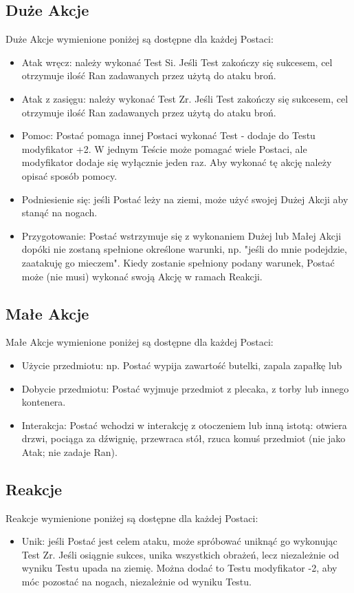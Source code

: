 \documentclass[10pt,a4paper]{book}
\begin{document}
\begin{multicols}{2}
\subsection*{Duże Akcje}
Duże Akcje wymienione poniżej są dostępne dla każdej Postaci:
\begin{itemize}
	\item Atak wręcz: należy wykonać Test Si. Jeśli Test zakończy się sukcesem, cel otrzymuje ilość Ran zadawanych przez użytą do ataku broń.
	\item Atak z zasięgu: należy wykonać Test Zr. Jeśli Test zakończy się sukcesem, cel otrzymuje ilość Ran zadawanych przez użytą do ataku broń.
	\item Pomoc: Postać pomaga innej Postaci wykonać Test - dodaje do Testu modyfikator +2. W jednym Teście może pomagać wiele Postaci, ale modyfikator dodaje się wyłącznie jeden raz. Aby wykonać tę akcję należy opisać sposób pomocy.
	\item Podniesienie się: jeśli Postać leży na ziemi, może użyć swojej Dużej Akcji aby stanąć na nogach.
	\item Przygotowanie: Postać wstrzymuje się z wykonaniem Dużej lub Małej Akcji dopóki nie zostaną spełnione określone warunki, np. "jeśli do mnie podejdzie, zaatakuję go mieczem". Kiedy zostanie spełniony podany warunek, Postać może (nie musi) wykonać swoją Akcję w ramach Reakcji.
\end{itemize}


\subsection*{Małe Akcje}
Małe Akcje wymienione poniżej są dostępne dla każdej Postaci:
\begin{itemize}
	\item Użycie przedmiotu: np. Postać wypija zawartość butelki, zapala zapałkę lub 
	\item Dobycie przedmiotu: Postać wyjmuje przedmiot z plecaka, z torby lub innego kontenera.
	\item Interakcja: Postać wchodzi w interakcję z otoczeniem lub inną istotą: otwiera drzwi, pociąga za dźwignię, przewraca stół, rzuca komuś przedmiot (nie jako Atak; nie zadaje Ran).
\end{itemize}


\subsection*{Reakcje}
Reakcje wymienione poniżej są dostępne dla każdej Postaci:
\begin{itemize}
	\item Unik: jeśli Postać jest celem ataku, może spróbować uniknąć go wykonując Test Zr. Jeśli osiągnie sukces, unika wszystkich obrażeń, lecz niezależnie od wyniku Testu upada na ziemię. Można dodać to Testu modyfikator -2, aby móc pozostać na nogach, niezależnie od wyniku Testu.
\end{itemize}


\end{multicols}
\end{document}
